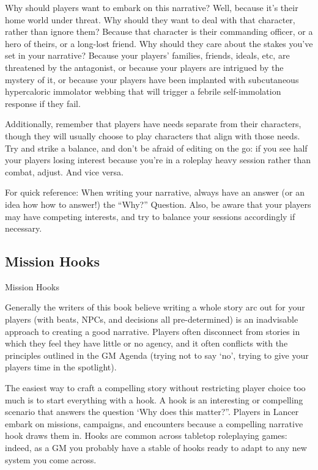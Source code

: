 Why should players want to embark on this narrative? Well, because it’s their home world under  
threat. Why should they want to deal with that character, rather than ignore them? Because that  
character is their commanding officer, or a hero of theirs, or a long-lost friend. Why should they  
care about the stakes you’ve set in your narrative? Because your players’ families, friends,  
ideals, etc, are threatened by the antagonist, or because your players are intrigued by the  
mystery of it, or because your players have been implanted with subcutaneous hypercaloric  
immolator webbing that will trigger a febrile self-immolation response if they fail. 
 

Additionally, remember that players have needs separate from their characters, though they will  
usually choose to play characters that align with those needs. Try and strike a balance, and don’t  
be afraid of editing on the go: if you see half your players losing interest because you’re in a  
roleplay heavy session rather than combat, adjust. And vice versa. 
 

For quick reference: When writing your narrative, always have an answer (or an idea how how to  
answer!) the “Why?” Question. Also, be aware that your players may have competing interests,  
and try to balance your sessions accordingly if necessary. 
 

                                                                                                          
\subsection{Mission Hooks}

                                           Mission Hooks   

Generally the writers of this book believe writing a whole story arc out for your players (with  
beats, NPCs, and decisions all pre-determined) is an inadvisable approach to creating a good  
narrative. Players often disconnect from stories in which they feel they have little or no agency,  
and it often conflicts with the principles outlined in the GM Agenda (trying not to say ‘no’, trying  
to give your players time in the spotlight).
 

The easiest way to craft a compelling story without restricting player choice too much is to start  
everything with a hook. A hook is an interesting or compelling scenario that answers the  
question ‘Why does this matter?”. Players in Lancer embark on missions, campaigns, and  
encounters because a compelling narrative hook draws them in. Hooks are common across  
tabletop roleplaying games: indeed, as a GM you probably have a stable of hooks ready to adapt  
to any new system you come across. 
 

